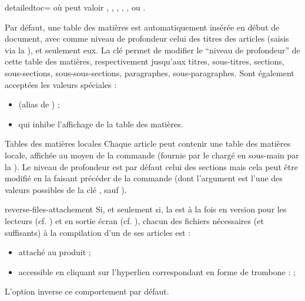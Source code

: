 \documentclass{letgut}
\begin{document}
{%
  \begin{docKey}[][doc
      updated={2025-10-23}]{detailedtoc}{=}{}
    où  peut valoir
    , , ,
    , ,  ou
    .

    Par défaut, une table des matières est automatiquement insérée en début de
    document, avec comme niveau de profondeur celui des titres des articles
    (saisis via la ), et seulement eux.  La clé
     permet de modifier le \enquote{niveau de profondeur} de
    cette table des matières, respectivement jusqu'aux titres, sous-titres,
    sections, sous-sections, sous-sous-sections, paragraphes,
    sous-paragraphes. Sont également acceptées les valeurs spéciales :
    \begin{itemize}
    \item {} (alias de ) ;
    \item {} qui inhibe l'affichage de la table des matières.
    \end{itemize}

    \begin{dbremark}{Tables des matières locales}{}
      Chaque article peut contenir une table des matières locale, affichée au
      moyen de la commande  (fournie par le
       chargé en sous-main par la ). Le niveau de
      profondeur est par défaut celui des sections mais cela peut être modifié
      en la faisant précéder de la commande 
      (dont l'argument est l'une des valeurs possibles de la clé
      , sauf ).
    \end{dbremark}
  \end{docKey}
}

\begin{docKey}[][doc new={2023-01-14}]{reverse-files-attachement}{}{}
  Si, et seulement si, la  est à la fois en version pour les lecteurs
  (cf. ) et en sortie écran (cf. ), chacun
  des fichiers nécessaires (et suffisants) à la compilation d'un de ses articles
  est :
  \begin{itemize}
  \item attaché au \pdf{} produit ;
  \item accessible en cliquant sur l'hyperlien correspondant en forme de
    trombone : \noattachfile[icon=Paperclip] ;
  \end{itemize}
  L'option  inverse ce comportement par
  défaut.
\end{docKey}
\end{document}
